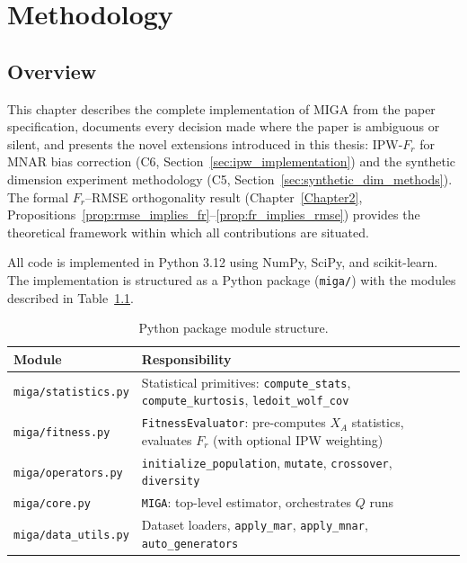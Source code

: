 
\chapter{Methodology}
\label{Chapter3}


\section{Overview}

This chapter describes the complete implementation of MIGA from the paper specification, documents every decision made where the paper is ambiguous or silent, and presents the novel extensions introduced in this thesis: IPW-$F_r$ for MNAR bias correction (C6, Section~\ref{sec:ipw_implementation}) and the synthetic dimension experiment methodology (C5, Section~\ref{sec:synthetic_dim_methods}). The formal $F_r$--RMSE orthogonality result (Chapter~\ref{Chapter2}, Propositions~\ref{prop:rmse_implies_fr}--\ref{prop:fr_implies_rmse}) provides the theoretical framework within which all contributions are situated.

All code is implemented in Python 3.12 using NumPy, SciPy, and scikit-learn. The implementation is structured as a Python package (\texttt{miga/}) with the modules described in Table~\ref{tab:modules}.

\begin{table}[h]
\caption{Python package module structure.}
\label{tab:modules}
\centering
\begin{tabular}{lp{9.5cm}}
\toprule
\textbf{Module} & \textbf{Responsibility} \\
\midrule
\texttt{miga/statistics.py} & Statistical primitives: \texttt{compute\_stats}, \texttt{compute\_kurtosis}, \texttt{ledoit\_wolf\_cov} \\
\texttt{miga/fitness.py}    & \texttt{FitnessEvaluator}: pre-computes $X_A$ statistics, evaluates $F_r$ (with optional IPW weighting) \\
\texttt{miga/operators.py}  & \texttt{initialize\_population}, \texttt{mutate}, \texttt{crossover}, \texttt{diversity} \\
\texttt{miga/core.py}       & \texttt{MIGA}: top-level estimator, orchestrates $Q$ runs \\
\texttt{miga/data\_utils.py}& Dataset loaders, \texttt{apply\_mar}, \texttt{apply\_mnar}, \texttt{auto\_generators} \\
\bottomrule
\end{tabular}
\end{table}

